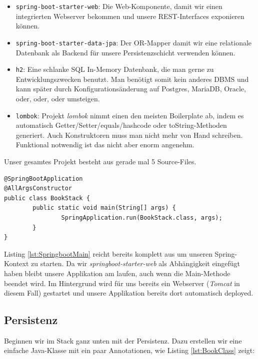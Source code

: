 \begin{itemize}
    
    \item\texttt{spring-boot-starter-web}: Die Web-Komponente, damit wir einen
    integrierten Webserver bekommen und unsere REST-Interfaces exponieren
    können.
    \item\texttt{spring-boot-starter-data-jpa}: Der OR-Mapper damit wir eine 
    relationale Datenbank als Backend für unsere Persistenzschicht
    verwenden können.
    \item\texttt{h2}: Eine schlanke SQL In-Memory Datenbank, die man gerne zu
    Entwicklungszwecken benutzt. Man benötigt somit kein anderes DBMS
    und kann später durch Konfigurationsänderung auf Postgres, MariaDB,
    Oracle, oder, oder, oder umsteigen.
    \item\texttt{lombok}: Projekt \textit{lombok} nimmt einen den meisten
    Boilerplate ab, indem es automatisch Getter/Setter/equals/hashcode
    oder toString-Methoden generiert. Auch Konstruktoren muss man
    nicht mehr von Hand schreiben. Funktional notwendig ist das nicht
    aber enorm angenehm.
\end{itemize}

Unser gesamtes Projekt besteht aus gerade mal 5 Source-Files.

\begin{listing}[H]
\begin{verbatim}
@SpringBootApplication
@AllArgsConstructor
public class BookStack {
        public static void main(String[] args) {
                SpringApplication.run(BookStack.class, args);
        }
}
\end{verbatim}
\caption{Leere Springboot Main-Klasse}
\label{lst:SpringbootMain}
\end{listing}

Listing \ref{lst:SpringbootMain} reicht bereits komplett aus um unseren
Spring-Kontext zu starten. Da wir \textit{springboot-starter-web} als 
Abhängigkeit eingefügt haben bleibt unsere Applikation am laufen, auch
wenn die Main-Methode beendet wird. Im Hintergrund wird für uns bereits
ein Webserver (\textit{Tomcat} in diesem Fall) gestartet und unsere
Applikation bereits dort automatisch deployed.

\subsection{Persistenz}
Beginnen wir im Stack ganz unten mit der Persistenz. Dazu erstellen wir
eine einfache Java-Klasse mit ein paar Annotationen, wie Listing 
\ref{lst:BookClass} zeigt:

